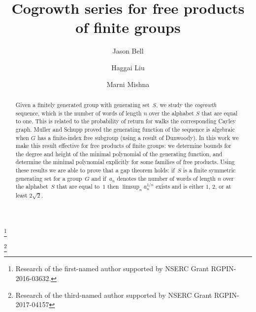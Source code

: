\documentclass[11pt]{amsart}
\theoremstyle{definition}
\begin{document}
\author{Jason Bell}
\address[J. Bell]{Department of Pure Mathematics \\
University of Waterloo\\
Waterloo, ON  N2L 3G1 \\
Canada}
\thanks{Research of the first-named author supported by NSERC Grant RGPIN-2016-03632.}

\author{Haggai Liu}
\address[H. Liu]{Department of Mathematics\\
Simon Fraser University\\
Burnaby, BC  V5A 1S6 \\
Canada}

\author{Marni Mishna}
\address[M. Mishna]{Department of Mathematics\\
Simon Fraser University\\
Burnaby, BC  V5A 1S6 \\
Canada}
\thanks{Research of the third-named author supported by NSERC Grant RGPIN-2017-04157}

\title{Cogrowth series for free products of finite groups}

\begin{abstract}
  Given a finitely generated group with generating set~$S$, we study
  the \emph{cogrowth} sequence, which is the number of words of
  length $n$ over the alphabet $S$ that are equal to one.  This is
  related to the probability of return for walks the corresponding
  Cayley graph.  Muller and Schupp proved the generating function of
  the sequence is algebraic when $G$ has a finite-index free subgroup
  (using a result of Dunwoody). In this work we make this
  result effective for free products of finite groups: we determine bounds for the degree and height of
  the minimal polynomial of the generating function, and determine the
  minimal polynomial explicitly for some families of free products.  Using these results we
  are able to prove that a gap theorem holds: if~$S$ is a finite
  symmetric generating set for a group~$G$ and if~$a_n$ denotes the
  number of words of length $n$ over the alphabet~$S$ that are equal
  to~$1$ then $\limsup_n a_n^{1/n}$ exists and is either $1$, $2$, or at least $2\sqrt{2}$.
\end{abstract}

\maketitle
\tableofcontents
\end{document}
